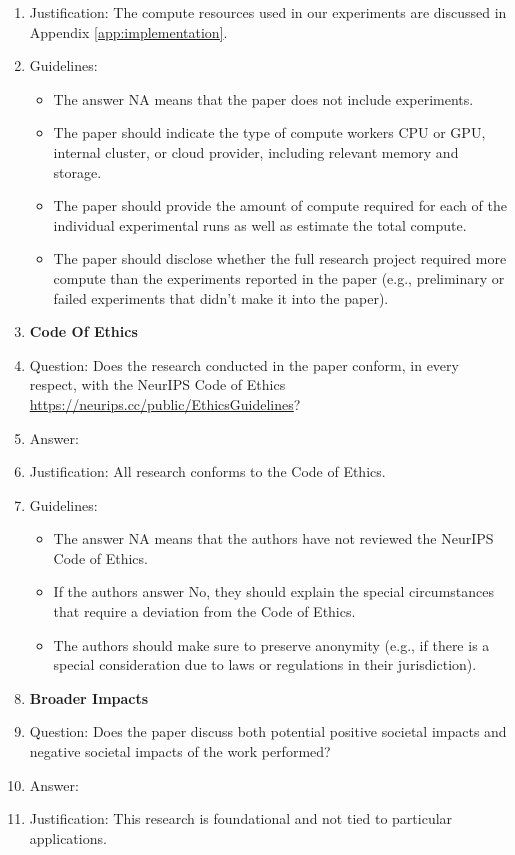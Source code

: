 \documentclass{article}
\begin{document}
\begin{enumerate}
    \item[] Justification: The compute resources used in our experiments are discussed in Appendix \ref{app:implementation}.
    \item[] Guidelines:
    \begin{itemize}
        \item The answer NA means that the paper does not include experiments.
        \item The paper should indicate the type of compute workers CPU or GPU, internal cluster, or cloud provider, including relevant memory and storage.
        \item The paper should provide the amount of compute required for each of the individual experimental runs as well as estimate the total compute.
        \item The paper should disclose whether the full research project required more compute than the experiments reported in the paper (e.g., preliminary or failed experiments that didn't make it into the paper).
    \end{itemize}
\item {\bf Code Of Ethics}
    \item[] Question: Does the research conducted in the paper conform, in every respect, with the NeurIPS Code of Ethics \url{https://neurips.cc/public/EthicsGuidelines}?
    \item[] Answer: \answerYes{}
    \item[] Justification: All research conforms to the Code of Ethics.
    \item[] Guidelines:
    \begin{itemize}
        \item The answer NA means that the authors have not reviewed the NeurIPS Code of Ethics.
        \item If the authors answer No, they should explain the special circumstances that require a deviation from the Code of Ethics.
        \item The authors should make sure to preserve anonymity (e.g., if there is a special consideration due to laws or regulations in their jurisdiction).
    \end{itemize}
\item {\bf Broader Impacts}
    \item[] Question: Does the paper discuss both potential positive societal impacts and negative societal impacts of the work performed?
    \item[] Answer: \answerNA{}
    \item[] Justification: This research is foundational and not tied to particular applications.

\end{enumerate}
\end{document}
